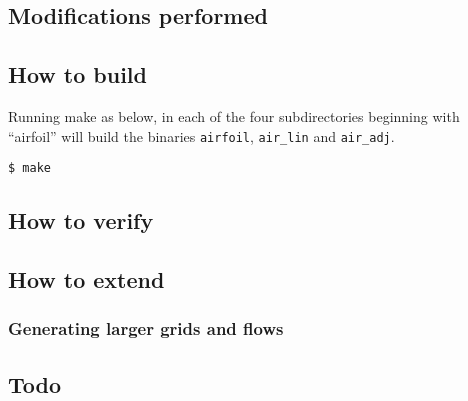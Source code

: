 \subsection{Modifications performed}
\subsection{How to build}
Running make as below, in each of the four subdirectories beginning with ``airfoil'' will build the  binaries \texttt{airfoil}, \texttt{air\_lin} and \texttt{air\_adj}.
\begin{lstlisting}[style=BashInputStyle]
    $ make
\end{lstlisting}
\subsection{How to verify}
\subsection{How to extend}
\subsubsection{Generating larger grids and flows}
\subsection{Todo}